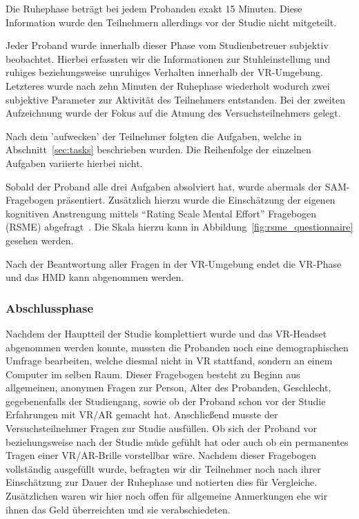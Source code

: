 Die Ruhephase beträgt bei jedem Probanden exakt 15 Minuten. Diese Information wurde den Teilnehmern allerdings vor der Studie nicht mitgeteilt.

Jeder Proband wurde innerhalb dieser Phase vom Studienbetreuer subjektiv beobachtet. Hierbei erfassten wir die Informationen zur Stuhleinstellung und ruhiges beziehungsweise unruhiges Verhalten innerhalb der VR-Umgebung. 
Letzteres wurde nach zehn Minuten der Ruhephase wiederholt wodurch zwei subjektive Parameter zur Aktivität des Teilnehmers entstanden. 
Bei der zweiten Aufzeichnung wurde der Fokus auf die Atmung des Versuchsteilnehmers gelegt.

Nach dem 'aufwecken' der Teilnehmer folgten die Aufgaben, welche in Abschnitt~\ref{sec:tasks} beschrieben wurden. Die Reihenfolge der einzelnen Aufgaben variierte hierbei nicht.

Sobald der Proband alle drei Aufgaben absolviert hat, wurde abermals der SAM-Fragebogen präsentiert. 
Zusätzlich hierzu wurde die Einschätzung der eigenen kognitiven Anstrengung mittels "`Rating Scale Mental Effort"' Fragebogen (RSME) abgefragt~\cite{wierwille1983validated}. Die Skala hierzu kann in Abbildung~\ref{fig:rsme_questionnaire} gesehen werden. 

Nach der Beantwortung aller Fragen in der VR-Umgebung endet die VR-Phase und das HMD kann abgenommen werden.

\subsubsection{Abschlussphase}

Nachdem der Hauptteil der Studie komplettiert wurde und das VR-Headset abgenommen werden konnte, mussten die Probanden noch eine demographischen Umfrage bearbeiten, welche diesmal nicht in VR stattfand, sondern an einem Computer im selben Raum. 
Dieser Fragebogen besteht zu Beginn aus allgemeinen, anonymen Fragen zur Person, Alter des Probanden, Geschlecht, gegebenenfalls der Studiengang, sowie ob der Proband schon vor der Studie Erfahrungen mit VR/AR gemacht hat. 
Anschließend musste der Versuchsteilnehmer Fragen zur Studie ausfüllen. Ob sich der Proband vor beziehungsweise nach der Studie müde gefühlt hat oder auch ob ein permanentes Tragen einer VR/AR-Brille vorstellbar wäre.
Nachdem dieser Fragebogen vollständig ausgefüllt wurde, befragten wir dir Teilnehmer noch nach ihrer Einschätzung zur Dauer der Ruhephase und notierten dies für Vergleiche. 
Zusätzlichen waren wir hier noch offen für allgemeine Anmerkungen ehe wir ihnen das Geld überreichten und sie verabschiedeten.
